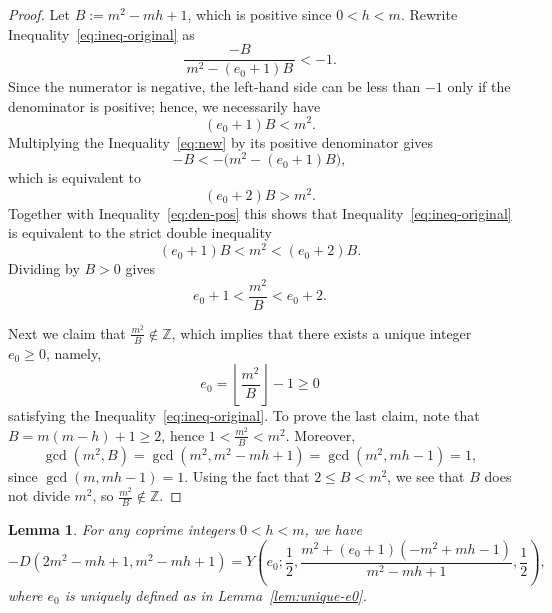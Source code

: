 \documentclass[11pt]{amsart}
\theoremstyle{plain}
\newtheorem{lemma}[theorem]{Lemma}
\theoremstyle{definition}
\theoremstyle{remark}
\numberwithin{theorem}{section}
\begin{document}
\begin{proof}
Let $B:=m^{2}-mh+1$, which is positive since $0 < h < m$.  
Rewrite Inequality~\eqref{eq:ineq-original} as
\begin{equation}\label{eq:new}
\frac{-B}{\,m^{2}-(e_{0}+1)B\,}< -1.
\end{equation}
Since the numerator is negative, the left-hand side can be less than $-1$ only if the denominator is positive; hence, we necessarily have
\begin{equation}\label{eq:den-pos}
(e_{0}+1)B<m^{2}.
\end{equation}
Multiplying the Inequality~\eqref{eq:new} by its positive denominator gives
\[
-B<-\bigl(m^{2}-(e_{0}+1)B\bigr),
\]
which is equivalent to 
\[
(e_{0}+2)B>m^{2}.
\]
Together with Inequality~\eqref{eq:den-pos} this shows that Inequality~\eqref{eq:ineq-original} is
equivalent to the strict double inequality
\begin{equation}\label{eq:double}
(e_{0}+1)B<m^{2}<(e_{0}+2)B.
\end{equation}
Dividing by $B>0$ gives
\begin{equation}\label{eq:unit-interval}
e_{0}+1<\frac{m^{2}}{B}<e_{0}+2.
\end{equation}

Next we claim that $\frac{m^{2}}{B}\notin\mathbb Z$, which implies that there exists a unique integer $e_0 \geq 0$, namely,    
\[
e_0= \left\lfloor \frac{m^{2}}{B}\right\rfloor -1 \ge 0
\] 
satisfying the Inequality~\eqref{eq:ineq-original}. To prove the last claim,  note that $B=m(m-h)+1\ge 2$, hence $1<\frac{m^{2}}{B}<m^{2}$.
Moreover,
\[
\gcd(m^{2},B)=\gcd(m^{2},m^{2}-mh+1)=\gcd(m^{2},mh-1)=1,
\]
since $\gcd(m,mh-1)=1$. 
Using the fact that  $2 \le B < m^2$, we see that $B$ does not divide $m^{2}$, so $\frac{m^{2}}{B}\notin\mathbb Z$.
\end{proof}

\begin{lemma}\label{lem:conversion}
For any coprime integers $0 < h < m$, we have 
$$
-D(2m^2-mh+1, m^2-mh+1)=Y\left(e_0; \dfrac{1}{2}, \dfrac{m^2+(e_0+1)(-m^2+mh-1)}{m^2-mh+1}, \dfrac{1}{2}\right),
$$ where $e_0$ is uniquely defined as in  Lemma~\ref{lem:unique-e0}. 
\end{lemma}
\end{document}
